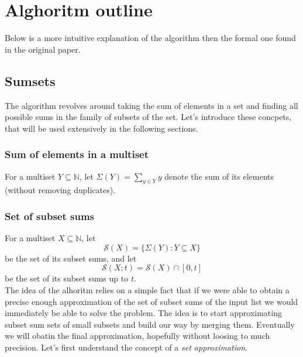 \section{Alghoritm outline}
Below is a more intuitive explanation of the algorithm then the formal one found in the original paper. 

\subsection{Sumsets}
The algorithm revolves around taking the sum of elements in a set and finding all possible sums in the family of subsets of the set. Let's introduce these concpets, that will be used extensively in the following sections.
\subsubsection{Sum of elements in a multiset}
For a multiset \( Y \subseteq \mathbb{N} \), let \( \Sigma(Y) = \sum_{y \in Y} y \) denote the sum of its elements (without removing duplicates).
\subsubsection {Set of subset sums}
For a multiset \( X \subseteq \mathbb{N} \), let 
\[ 
    \mathcal{S}(X) = \{ \Sigma(Y) : Y \subseteq X \} 
\] be the set of its subset sums, and let 
\[ 
    \mathcal{S}(X; t) = \mathcal{S}(X) \cap [0, t] 
\] be the set of its subset sums up to \( t \). \\ 

The idea of the alhoritm relies on a simple fact that if we were able to obtain a precise enough approximation of the set of subset sums of the input list we would immediately be able to solve the \Partition problem. The idea is to start approximating subset sum sets of small subsets and build our way by merging them. Eventually we will obatin the final approximation, hopefully without loosing to much precision. Let's first understand the concept of a \textit{set approximation}.

